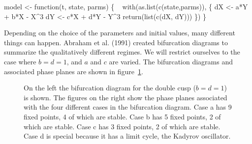 \documentclass[
  a4paper,
  DIV=11,
  numbers=noendperiod,
  oneside]{scrreprt}
\newenvironment{Shaded}{}{}
\newcommand{\ControlFlowTok}[1]{\textcolor[rgb]{0.84,0.23,0.29}{#1}}
\newcommand{\DecValTok}[1]{\textcolor[rgb]{0.00,0.36,0.77}{#1}}
\newcommand{\FunctionTok}[1]{\textcolor[rgb]{0.44,0.26,0.76}{#1}}
\newcommand{\NormalTok}[1]{\textcolor[rgb]{0.14,0.16,0.18}{#1}}
\newcommand{\OtherTok}[1]{\textcolor[rgb]{0.44,0.26,0.76}{#1}}
\newcommand{\SpecialCharTok}[1]{\textcolor[rgb]{0.00,0.36,0.77}{#1}}
\begin{document}
\begin{Shaded}
\begin{Highlighting}[]
\NormalTok{model }\OtherTok{\textless{}{-}} \ControlFlowTok{function}\NormalTok{(t, state, parms) \{   }
  \FunctionTok{with}\NormalTok{(}\FunctionTok{as.list}\NormalTok{(}\FunctionTok{c}\NormalTok{(state,parms)), \{}
\NormalTok{    dX }\OtherTok{\textless{}{-}}\NormalTok{ a}\SpecialCharTok{*}\NormalTok{Y }\SpecialCharTok{+}\NormalTok{ b}\SpecialCharTok{*}\NormalTok{X }\SpecialCharTok{{-}}\NormalTok{ X}\SpecialCharTok{\^{}}\DecValTok{3} 
\NormalTok{    dY }\OtherTok{\textless{}{-}}\NormalTok{ c}\SpecialCharTok{*}\NormalTok{X }\SpecialCharTok{+}\NormalTok{ d}\SpecialCharTok{*}\NormalTok{Y }\SpecialCharTok{{-}}\NormalTok{ Y}\SpecialCharTok{\^{}}\DecValTok{3}
    \FunctionTok{return}\NormalTok{(}\FunctionTok{list}\NormalTok{(}\FunctionTok{c}\NormalTok{(dX, dY))) }
\NormalTok{  \})}
\NormalTok{\}}
\end{Highlighting}
\end{Shaded}

Depending on the choice of the parameters and initial values, many
different things can happen. Abraham et al. (1991) created bifurcation
diagrams to summarize the qualitatively different regimes. We will
restrict ourselves to the case where \(b = d = 1\), and \(a\) and \(c\)
are varied. The bifurcation diagrams and associated phase planes are
shown in figure~\ref{fig-ch4n-img16-old-64}.

\begin{figure}


\caption{\label{fig-ch4n-img16-old-64}On the left the bifurcation
diagram for the double cusp (\(b = d = 1\)) is shown. The figures on the
right show the phase planes associated with the four different cases in
the bifurcation diagram. Case a has 9 fixed points, 4 of which are
stable. Case b has 5 fixed points, 2 of which are stable. Case c has 3
fixed points, 2 of which are stable. Case d is special because it has a
limit cycle, the Kadyrov oscillator.}

\end{figure}%
\end{document}
